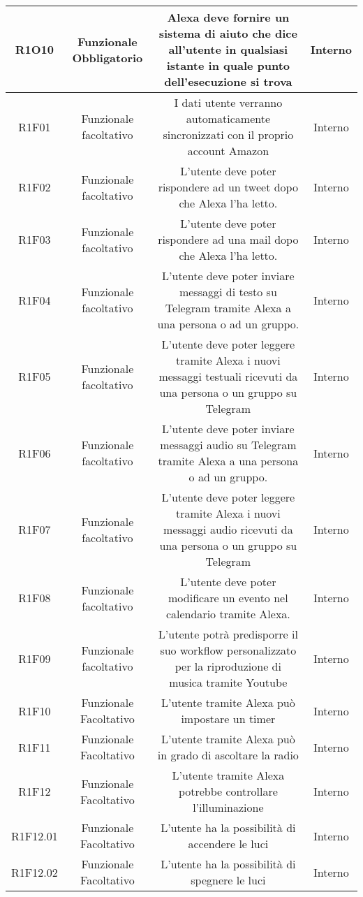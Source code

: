 \begin{tabularx}{\textwidth}{|C|C|C|C|}
	\hline
	R1O10&Funzionale Obbligatorio&Alexa deve fornire un sistema di aiuto che dice all'utente in qualsiasi istante in quale punto dell'esecuzione si trova & Interno\\
	\hline
	R1F01 & Funzionale facoltativo & I dati utente verranno automaticamente sincronizzati con il proprio account Amazon & Interno\\
	\hline
	R1F02 & Funzionale facoltativo & L'utente deve poter rispondere ad un tweet dopo che Alexa l'ha letto. & Interno\\
	\hline
	R1F03 & Funzionale facoltativo & L'utente deve poter rispondere ad una mail dopo che Alexa l'ha letto. & Interno\\
	\hline
	R1F04 & Funzionale facoltativo & L'utente deve poter inviare messaggi di testo su Telegram tramite Alexa a una persona o ad un gruppo. & Interno\\
	\hline
	R1F05 & Funzionale facoltativo & L'utente deve poter leggere tramite Alexa i nuovi messaggi testuali ricevuti da una persona o un gruppo su Telegram  & Interno\\
	\hline
	R1F06 & Funzionale facoltativo & L'utente deve poter inviare messaggi audio su Telegram tramite Alexa a una persona o ad un gruppo.  & Interno\\
	\hline
	R1F07 & Funzionale facoltativo & L'utente deve poter leggere tramite Alexa i nuovi messaggi audio ricevuti da una persona o un gruppo su Telegram   & Interno\\
	\hline
	R1F08 & Funzionale facoltativo & L'utente deve poter modificare un evento nel calendario tramite Alexa. & Interno\\
	\hline
	R1F09 & Funzionale facoltativo & L'utente potrà predisporre il suo workflow personalizzato per la riproduzione di musica tramite Youtube & Interno\\
	\hline
	R1F10&Funzionale Facoltativo  &L'utente tramite Alexa può impostare un timer &Interno \\
	\hline
	R1F11&Funzionale Facoltativo  &L'utente tramite Alexa può in grado di ascoltare la radio &Interno \\
	\hline	
	R1F12&Funzionale Facoltativo  &L'utente tramite Alexa potrebbe controllare l'illuminazione &Interno \\
	\hline
	R1F12.01&Funzionale Facoltativo  &L'utente ha la possibilità di accendere le luci &Interno \\
	\hline
	R1F12.02&Funzionale Facoltativo  &L'utente ha la possibilità di spegnere le luci &Interno \\

\end{tabularx}
